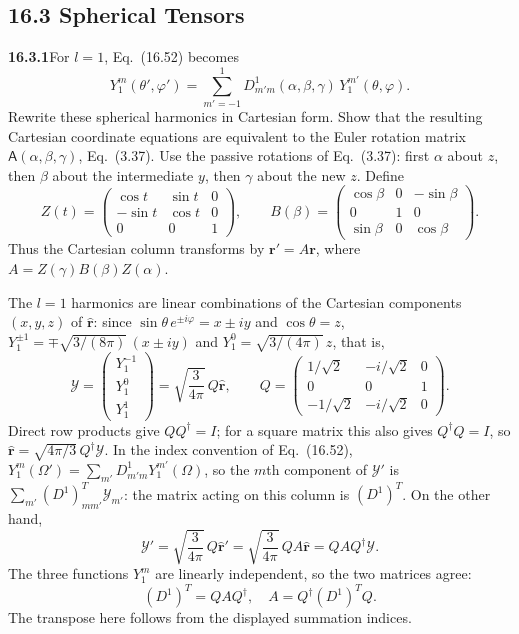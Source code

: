 \subsection*{16.3 Spherical Tensors}

\par\bigskip
\noindent\textbf{16.3.1}\quad For $l=1$, Eq.~(16.52) becomes
\[
Y_{1}^{m}(\theta',\varphi')
=\sum_{m'=-1}^{1}D_{m'm}^{1}(\alpha,\beta,\gamma)\,
Y_{1}^{m'}(\theta,\varphi).
\]
Rewrite these spherical harmonics in Cartesian form. Show that the
resulting Cartesian coordinate equations are equivalent to the Euler
rotation matrix $\mathsf{A}(\alpha,\beta,\gamma)$, Eq.~(3.37).
\solution
Use the passive rotations of Eq.~(3.37): first $\alpha$ about $z$,
then $\beta$ about the intermediate $y$, then $\gamma$ about the
new $z$. Define
\[
Z(t)=\begin{pmatrix}\cos t&\sin t&0\\-\sin t&\cos t&0\\0&0&1\end{pmatrix},
\qquad
B(\beta)=\begin{pmatrix}\cos\beta&0&-\sin\beta\\0&1&0\\
\sin\beta&0&\cos\beta\end{pmatrix}.
\]
Thus the Cartesian column transforms by
$\mathbf r'=A\mathbf r$, where $A=Z(\gamma)B(\beta)Z(\alpha)$.

The $l=1$ harmonics are linear combinations of the Cartesian
components $(x,y,z)$ of $\hat{\mathbf r}$: since
$\sin\theta\,e^{\pm i\varphi}=x\pm iy$ and $\cos\theta=z$,
$Y_1^{\pm1}=\mp\sqrt{3/(8\pi)}\,(x\pm iy)$ and
$Y_1^0=\sqrt{3/(4\pi)}\,z$, that is,
\[
\mathcal Y=\begin{pmatrix}Y_1^{-1}\\Y_1^0\\Y_1^1\end{pmatrix}
=\sqrt{\frac3{4\pi}}\,Q\hat{\mathbf r},\qquad
Q=\begin{pmatrix}
1/\sqrt2&-i/\sqrt2&0\\
0&0&1\\
-1/\sqrt2&-i/\sqrt2&0
\end{pmatrix}.
\]
Direct row products give $QQ^\dagger=I$; for a square matrix this
also gives $Q^\dagger Q=I$, so
$\hat{\mathbf r}=\sqrt{4\pi/3}\,Q^\dagger\mathcal Y$.
In the index convention of Eq.~(16.52),
$Y_1^m(\Omega')=\sum_{m'}D^1_{m'm}Y_1^{m'}(\Omega)$, so the $m$th
component of $\mathcal Y'$ is $\sum_{m'}(D^1)^T_{mm'}\mathcal Y_{m'}$:
the matrix acting on this column is $(D^1)^T$. On the other hand,
\[
\mathcal Y'=\sqrt{\frac3{4\pi}}\,Q\hat{\mathbf r}'
=\sqrt{\frac3{4\pi}}\,QA\hat{\mathbf r}
=QAQ^\dagger\mathcal Y.
\]
The three functions $Y_1^m$ are linearly independent, so the two
matrices agree:
\[
\boxed{(D^1)^T=QAQ^\dagger,\quad A=Q^\dagger(D^1)^TQ}.
\]
The transpose here follows from the displayed summation indices.

